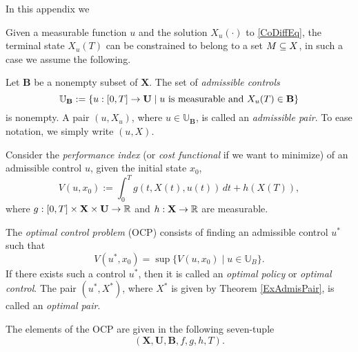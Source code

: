 


In this appendix we 


	Given a measurable function $u$ and the solution $X_u(\cdot)$ to 
\eqref{CoDiffEq}, the terminal state $X_u(T)$ can be constrained to belong to a set $M\subseteq X$, in such a case we assume the following. 

\begin{assumption}\rm Let $\mathbf{B}$ be a nonempty subset of $\mathbf{X}$. 
	The set of {\it admissible controls} 
	\begin{equation}\label{FeasCont}  
		 \mathbb{U}_\mathbf{B}:=\{u:[0,T]\to \mathbf{U}\mid u\  
		 \mbox{\rm is measurable and } X_u(T)\in \mathbf{B}\} 
	\end{equation}
	is nonempty. A pair $(u,X_u)$, where $u\in \mathbb{U}_\mathbf{B}$, is called an 
	{\it admissible pair}. To ease notation, we simply write $(u,X)$.
\end{assumption}


Consider the {\it performance index} (or {\it cost functional} if we want to minimize) of an admissible control $u$, given the initial state $x_0$, 
        \begin{equation}\label{PiBolza} V(u,x_0) := \int_0^Tg(t,X(t),u(t))\,dt + h(X(T)),\end{equation}
where $g:[0,T]\times \mathbf{X}\times \mathbf{U}\to \mathbb{R}$ and $h:\mathbf{X}\to\mathbb{R}$ are measurable.

The {\it optimal control problem} (OCP) consists of finding an admissible control $u^\ast$ such that
\[ V(u^\ast,x_0)=\sup\{ V(u,x_0)\mid u\in \mathbb{U}_B \}.\]
If there exists such a control $u^\ast$, then it is called an {\it optimal policy} or {\it optimal control}. The pair $(u^\ast,X^\ast)$, where $X^\ast$ is given by Theorem \ref{ExAdmisPair}, is called an {\it optimal pair}.

The elements of the OCP are given in the following seven-tuple 
   \begin{equation}\label{OCP}
       (\mathbf{X},\mathbf{U},\mathbf{B},f,g,h,T).
   \end{equation}



